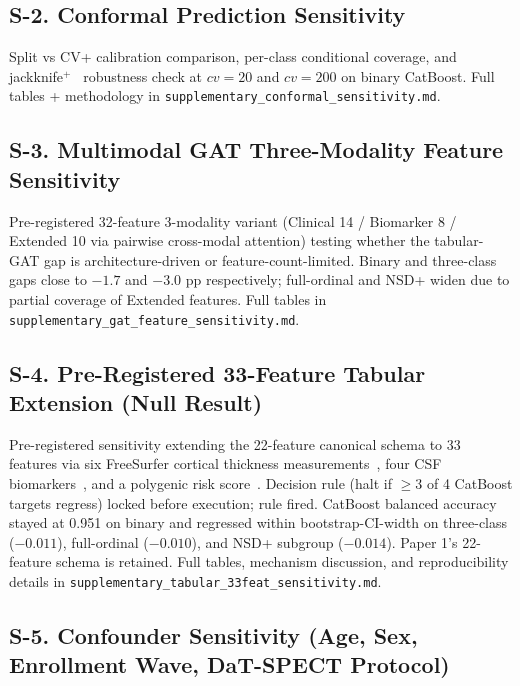 \subsection*{S-2. Conformal Prediction Sensitivity}

Split vs CV+ calibration comparison, per-class conditional coverage, and jackknife$^+$~\cite{barber2021jackknife} robustness check at $cv{=}20$ and $cv{=}200$ on binary CatBoost. Full tables + methodology in \texttt{supplementary\_conformal\_sensitivity.md}.

\subsection*{S-3. Multimodal GAT Three-Modality Feature Sensitivity}

Pre-registered 32-feature 3-modality variant (Clinical 14 / Biomarker 8 / Extended 10 via pairwise cross-modal attention) testing whether the tabular-GAT gap is architecture-driven or feature-count-limited. Binary and three-class gaps close to $-1.7$ and $-3.0$ pp respectively; full-ordinal and NSD+ widen due to partial coverage of Extended features. Full tables in \texttt{supplementary\_gat\_feature\_sensitivity.md}.

\subsection*{S-4. Pre-Registered 33-Feature Tabular Extension (Null Result)}

Pre-registered sensitivity extending the 22-feature canonical schema to 33 features via six FreeSurfer cortical thickness measurements~\cite{fischl2012}, four CSF biomarkers~\cite{mollenhauer2017}, and a polygenic risk score~\cite{nalls2019}. Decision rule (halt if $\geq3$ of 4 CatBoost targets regress) locked before execution; rule fired. CatBoost balanced accuracy stayed at 0.951 on binary and regressed within bootstrap-CI-width on three-class ($-0.011$), full-ordinal ($-0.010$), and NSD+ subgroup ($-0.014$). Paper 1's 22-feature schema is retained. Full tables, mechanism discussion, and reproducibility details in \texttt{supplementary\_tabular\_33feat\_sensitivity.md}.

\subsection*{S-5. Confounder Sensitivity (Age, Sex, Enrollment Wave, DaT-SPECT Protocol)}
\label{p1:sec:supp:confounders}

